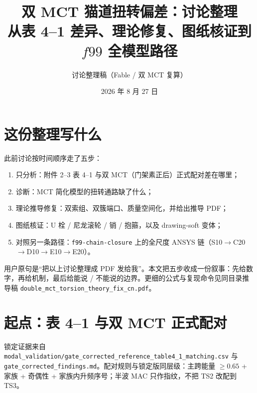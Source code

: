 \documentclass[11pt,a4paper]{ctexart}
\title{\bfseries 双 MCT 猫道扭转偏差：讨论整理\\
\large 从表 4--1 差异、理论修复、图纸核证到 $f99$ 全模型路径}
\author{讨论整理稿（Fable / 双 MCT 复算）}
\date{2026 年 8 月 27 日}
\begin{document}
\maketitle

\noindent{}

\tableofcontents
\vspace{0.6em}

\section{这份整理写什么}

此前讨论按时间顺序走了五步：
\begin{enumerate}
  \item 只分析：附件 2--3 表 4--1 与双 MCT（门架素正后）正式配对差在哪里；
  \item 诊断：MCT 简化模型的扭转通路缺了什么；
  \item 理论推导修复：双索组、双簇端口、质量空间化，并给出推导 PDF；
  \item 图纸核证：U 栓 / 尼龙滚轮 / 销 / 抱箍，以及 drawing-soft 变体；
  \item 对照另一条路径：\texttt{f99-chain-closure} 上的全尺度 ANSYS 链（S10$\to$C20$\to$D10$\to$E10$\to$E20）。
\end{enumerate}
用户原句是``把以上讨论整理成 PDF 发给我''。本文把五步收成一份叙事：先给数字，再给机制，最后给能说 / 不能说的边界。更细的公式与复现命令见同目录推导稿
\texttt{double\_mct\_torsion\_theory\_fix\_cn.pdf}。

\section{起点：表 4--1 与双 MCT 正式配对}

锁定证据来自
\texttt{modal\_validation/gate\_corrected\_reference\_table4\_1\_matching.csv}
与 \texttt{gate\_corrected\_findings.md}。配对规则与锁定版同层级：主跨能量 $\ge0.65$ + 家族 + 奇偶性 + 家族内升频序号；半波 MAC 只作指纹，不把 TS2 改配到 TS3。
\end{document}
